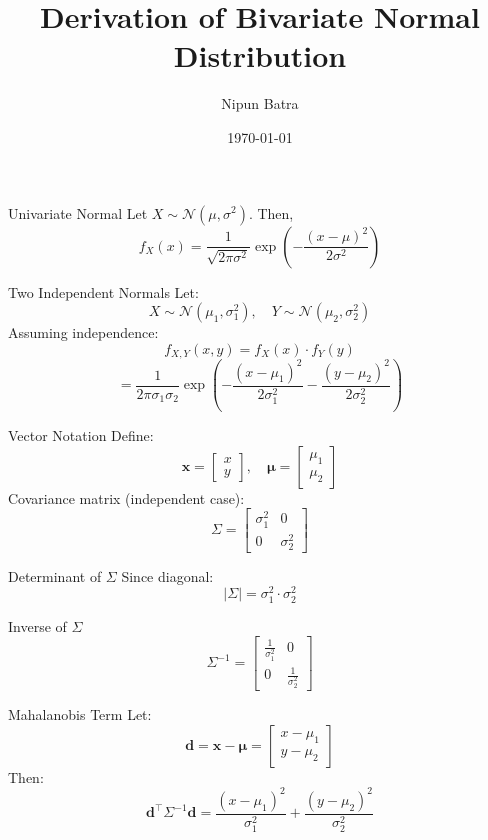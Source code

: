 \documentclass{beamer}
\title{Derivation of Bivariate Normal Distribution}
\author{Nipun Batra}
\date{\today}
\begin{document}
\frame{\titlepage}

\begin{frame}{Univariate Normal}
Let \( X \sim \mathcal{N}(\mu, \sigma^2) \). Then,
\[
f_X(x) = \frac{1}{\sqrt{2\pi \sigma^2}} \exp\left( -\frac{(x - \mu)^2}{2\sigma^2} \right)
\]
\end{frame}

\begin{frame}{Two Independent Normals}
Let:
\[
X \sim \mathcal{N}(\mu_1, \sigma_1^2), \quad Y \sim \mathcal{N}(\mu_2, \sigma_2^2)
\]
Assuming independence:
\[
f_{X,Y}(x, y) = f_X(x) \cdot f_Y(y)
\]
\[
= \frac{1}{2\pi \sigma_1 \sigma_2} 
\exp\left( -\frac{(x - \mu_1)^2}{2\sigma_1^2} -\frac{(y - \mu_2)^2}{2\sigma_2^2} \right)
\]
\end{frame}

\begin{frame}{Vector Notation}
Define:
\[
\bm{x} = \begin{bmatrix} x \\ y \end{bmatrix}, \quad 
\bm{\mu} = \begin{bmatrix} \mu_1 \\ \mu_2 \end{bmatrix}
\]
Covariance matrix (independent case):
\[
\Sigma = \begin{bmatrix}
\sigma_1^2 & 0 \\
0 & \sigma_2^2
\end{bmatrix}
\]
\end{frame}

\begin{frame}{Determinant of \( \Sigma \)}
Since diagonal:
\[
|\Sigma| = \sigma_1^2 \cdot \sigma_2^2
\]
\end{frame}

\begin{frame}{Inverse of \( \Sigma \)}
\[
\Sigma^{-1} = \begin{bmatrix}
\frac{1}{\sigma_1^2} & 0 \\
0 & \frac{1}{\sigma_2^2}
\end{bmatrix}
\]
\end{frame}

\begin{frame}{Mahalanobis Term}
Let:
\[
\bm{d} = \bm{x} - \bm{\mu} = \begin{bmatrix} x - \mu_1 \\ y - \mu_2 \end{bmatrix}
\]
Then:
\[
\bm{d}^\top \Sigma^{-1} \bm{d}
= \frac{(x - \mu_1)^2}{\sigma_1^2} + \frac{(y - \mu_2)^2}{\sigma_2^2}
\]
\end{frame}
\end{document}
